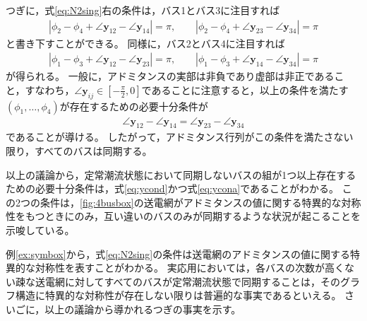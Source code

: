 \documentclass[tombow,dvipdfmx]{corona-a5}
\begin{document}
\begin{例}
つぎに，式\ref{eq:N2sing}右の条件は，バス1とバス3に注目すれば
\begin{align*}
|\phi_2 - \phi_4 + \angle \bm{y}_{12} - \angle \bm{y}_{14}|=\pi
,\qquad
|\phi_2 - \phi_4 + \angle \bm{y}_{23} - \angle \bm{y}_{34}|=\pi
\end{align*}
と書き下すことができる。
同様に，バス2とバス4に注目すれば
\begin{align*}
|\phi_1 - \phi_3 + \angle \bm{y}_{12} - \angle \bm{y}_{23}|=\pi
,\qquad
|\phi_1 - \phi_3 + \angle \bm{y}_{14} - \angle \bm{y}_{34}|=\pi
\end{align*}
が得られる。
一般に，アドミタンスの実部は非負であり虚部は非正であること，すなわち，$\angle \bm{y}_{ij} \in \left[-\frac{\pi}{2},0 \right]$であることに注意すると，以上の条件を満たす$(\phi_1,\ldots,\phi_4)$が存在するための必要十分条件が
\begin{align}\label{eq:ycona}
\angle \bm{y}_{12} - \angle \bm{y}_{14}=
\angle \bm{y}_{23} - \angle \bm{y}_{34}
\end{align}
であることが導ける。
したがって，アドミタンス行列がこの条件を満たさない限り，すべてのバスは同期する。

以上の議論から，定常潮流状態において同期しないバスの組が1つ以上存在するための必要十分条件は，式\ref{eq:ycond}かつ式\ref{eq:ycona}であることがわかる。
この2つの条件は，\ref{fig:4busbox}の送電網がアドミタンスの値に関する特異的な対称性をもつときにのみ，互い違いのバスのみが同期するような状況が起こることを示唆している。
\end{例}

例\ref{ex:symbox}から，式\ref{eq:N2sing}の条件は送電網のアドミタンスの値に関する特異的な対称性を表すことがわかる。
実応用においては，各バスの次数が高くない疎な送電網に対してすべてのバスが定常潮流状態で同期することは，そのグラフ構造に特異的な対称性が存在しない限りは普遍的な事実であるといえる。
さいごに，以上の議論から導かれるつぎの事実を示す。
\end{document}
